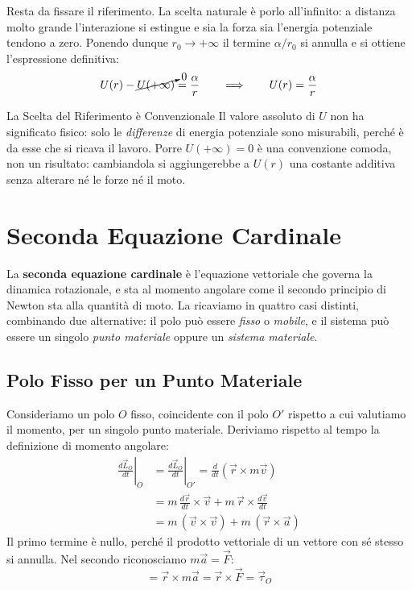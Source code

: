 Resta da fissare il riferimento. La scelta naturale è porlo all'infinito: a distanza molto grande l'interazione si estingue e sia la forza sia l'energia potenziale tendono a zero. Ponendo dunque $r_0 \to +\infty$ il termine $\alpha/r_0$ si annulla e si ottiene l'espressione definitiva:
\begin{equation}
    U(r) - \cancelto{0}{U(+\infty)} = \frac{\alpha}{r}
    \qquad \Longrightarrow \qquad
    U(r) = \frac{\alpha}{r}
\end{equation}

\begin{attenzione}{La Scelta del Riferimento è Convenzionale}
Il valore assoluto di $U$ non ha significato fisico: solo le \emph{differenze} di energia potenziale sono misurabili, perché è da esse che si ricava il lavoro. Porre $U(+\infty) = 0$ è una convenzione comoda, non un risultato: cambiandola si aggiungerebbe a $U(r)$ una costante additiva senza alterare né le forze né il moto.
\end{attenzione}

\section{Seconda Equazione Cardinale}

La \textbf{seconda equazione cardinale} è l'equazione vettoriale che governa la dinamica rotazionale, e sta al momento angolare come il secondo principio di Newton sta alla quantità di moto. La ricaviamo in quattro casi distinti, combinando due alternative: il polo può essere \textit{fisso} o \textit{mobile}, e il sistema può essere un singolo \textit{punto materiale} oppure un \textit{sistema materiale}.

\subsection{Polo Fisso per un Punto Materiale}

Consideriamo un polo $O$ fisso, coincidente con il polo $O'$ rispetto a cui valutiamo il momento, per un singolo punto materiale. Deriviamo rispetto al tempo la definizione di momento angolare:
\begin{align}
    \left. \frac{d\vec{L}_O}{dt} \right|_{O} &= \left. \frac{d\vec{L}_O}{dt} \right|_{O'} = \frac{d}{dt}\left(\vec{r} \times m\vec{v}\right) \\
    &= m \, \frac{d\vec{r}}{dt} \times \vec{v} + m\,\vec{r} \times \frac{d\vec{v}}{dt} \\
    &= m\,(\vec{v} \times \vec{v}) + m\,(\vec{r} \times \vec{a})
\end{align}
Il primo termine è nullo, perché il prodotto vettoriale di un vettore con sé stesso si annulla. Nel secondo riconosciamo $m\vec{a} = \vec{F}$:
\begin{equation*}
    = \vec{r} \times m\vec{a} = \vec{r} \times \vec{F} = \vec{\tau}_O
\end{equation*}

